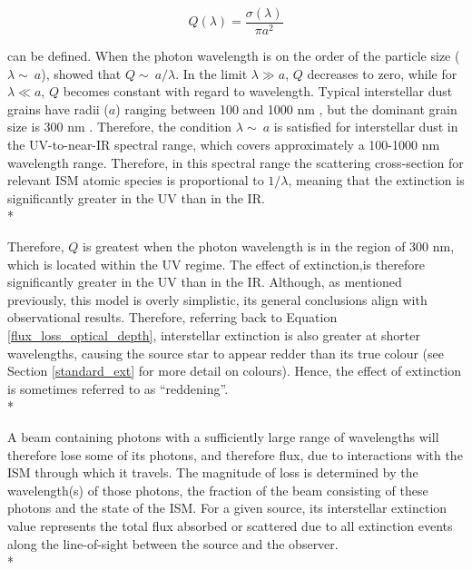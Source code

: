 \documentclass[12pt, a4paper]{report}
\begin{document}
\begin{equation}
Q(\lambda) = \frac{\sigma(\lambda)}{\pi a^{2}}
\label{ext_wavelength}
\end{equation}

can be defined. When the photon wavelength is on the order of the particle size ($\lambda \sim\ a$), \cite{1908AnP...330..377M} showed that $Q \sim\ a/\lambda$. In the limit $\lambda \gg a$, $Q$ decreases to zero, while for $\lambda \ll a$, $Q$ becomes constant with regard to wavelength. Typical interstellar dust grains have radii ($a$) ranging between 100 and 1000 nm \citep{2000JGR...10510299W}, but the dominant grain size is 300 nm \citep{2003JGRA..108.8030L}. Therefore, the condition $\lambda \sim\ a$ is satisfied for interstellar dust in the UV-to-near-IR spectral range, which covers approximately a 100-1000 nm wavelength range. Therefore, in this spectral range the scattering cross-section for relevant ISM atomic species is proportional to $1/\lambda$, meaning that the extinction is significantly greater in the UV than in the IR. \\*

Therefore, $Q$ is greatest when the photon wavelength is in the region of 300 nm, which is located within the UV regime. The effect of extinction,is therefore significantly greater in the UV than in the IR. Although, as mentioned previously, this model is overly simplistic, its general conclusions align with observational results. Therefore, referring back to Equation \ref{flux_loss_optical_depth}, interstellar extinction is also greater at shorter wavelengths, causing the source star to appear redder than its true colour (see Section \ref{standard_ext} for more detail on colours). Hence, the effect of extinction is sometimes referred to as ``reddening''.\\* 


A beam containing photons with a sufficiently large range of wavelengths will therefore lose some of its photons, and therefore flux, due to interactions with the ISM through which it travels. The magnitude of loss is determined by the wavelength(s) of those photons, the fraction of the beam consisting of these photons and the state of the ISM. For a given source, its interstellar extinction value represents the total flux absorbed or scattered due to all extinction events along the line-of-sight between the source and the observer.\\*
\end{document}
